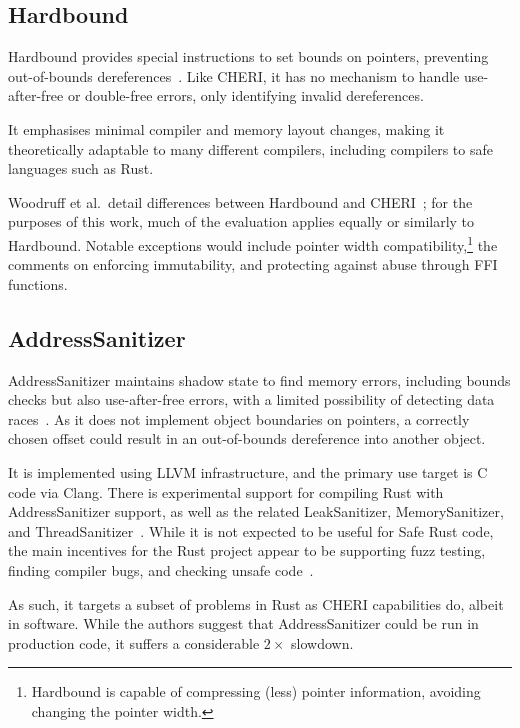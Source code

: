 \documentclass[dissertation.tex]{subfiles}
\begin{document}
\subsection{Hardbound}
\label{sec:rel-hardbound}

Hardbound provides special instructions to set bounds on pointers,
preventing out-of-bounds dereferences~\cite{devietti-hardbound}.
Like CHERI, it has no mechanism to handle use-after-free or double-free
errors, only identifying invalid dereferences.

It emphasises minimal compiler and memory layout changes, making it
theoretically adaptable to many different compilers, including compilers
to safe languages such as Rust.

Woodruff et al.\ detail differences between Hardbound and
CHERI~\cite{cheri-risc-2014}; for the purposes of this work, much of the
evaluation applies equally or similarly to Hardbound.
Notable exceptions would include pointer width compatibility,\footnote{
Hardbound is capable of compressing (less) pointer information, avoiding
changing the pointer width.
} the comments on enforcing immutability, and protecting against abuse
through FFI functions.


\subsection{AddressSanitizer}
\label{sec:rel-asan}

AddressSanitizer maintains shadow state to find memory errors, including
bounds checks but also use-after-free errors, with a limited possibility
of detecting data races~\cite{serebryany-asan}.
As it does not implement object boundaries on pointers, a correctly
chosen offset could result in an out-of-bounds dereference into another
object.

It is implemented using LLVM infrastructure, and the primary use target
is C code via Clang.
There is experimental support for compiling Rust with AddressSanitizer
support, as well as the related LeakSanitizer, MemorySanitizer, and
ThreadSanitizer~\cite{rust-san}.
While it is not expected to be useful for Safe Rust code, the main
incentives for the Rust project appear to be supporting fuzz testing,
finding compiler bugs, and checking unsafe code~\cite{rust-asan-track}.

As such, it targets a subset of problems in Rust as CHERI capabilities
do, albeit in software.
While the authors suggest that AddressSanitizer could be run in
production code, it suffers a considerable \(2\times\) slowdown.
\end{document}

